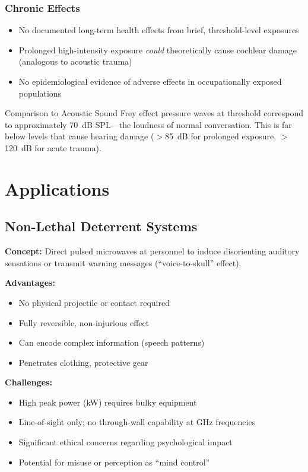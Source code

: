 \subsubsection{Chronic Effects}
\begin{itemize}
\item No documented long-term health effects from brief, threshold-level exposures
\item Prolonged high-intensity exposure \emph{could} theoretically cause cochlear damage (analogous to acoustic trauma)
\item No epidemiological evidence of adverse effects in occupationally exposed populations
\end{itemize}

\begin{calloutbox}{Comparison to Acoustic Sound}
Frey effect pressure waves at threshold correspond to approximately 70~dB SPL---the loudness of normal conversation. This is far below levels that cause hearing damage ($>$85~dB for prolonged exposure, $>$120~dB for acute trauma).
\end{calloutbox}

\section{Applications}

\subsection{Non-Lethal Deterrent Systems}

\textbf{Concept:} Direct pulsed microwaves at personnel to induce disorienting auditory sensations or transmit warning messages (``voice-to-skull'' effect).

\textbf{Advantages:}
\begin{itemize}
\item[\checkmark] No physical projectile or contact required
\item[\checkmark] Fully reversible, non-injurious effect
\item[\checkmark] Can encode complex information (speech patterns)
\item[\checkmark] Penetrates clothing, protective gear
\end{itemize}

\textbf{Challenges:}
\begin{itemize}
\item[\texttimes] High peak power (kW) requires bulky equipment
\item[\texttimes] Line-of-sight only; no through-wall capability at GHz frequencies
\item[\texttimes] Significant ethical concerns regarding psychological impact
\item[\texttimes] Potential for misuse or perception as ``mind control''
\end{itemize}

